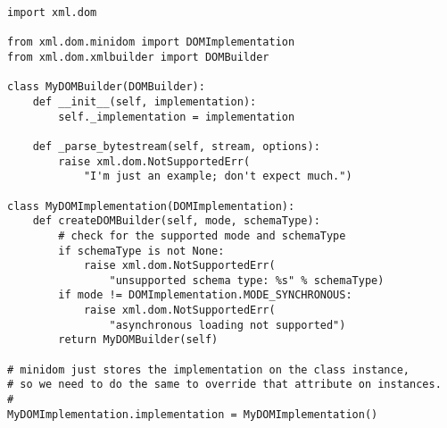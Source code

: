 \documentclass{howto}
\begin{document}
\begin{verbatim}
import xml.dom

from xml.dom.minidom import DOMImplementation
from xml.dom.xmlbuilder import DOMBuilder

class MyDOMBuilder(DOMBuilder):
    def __init__(self, implementation):
        self._implementation = implementation

    def _parse_bytestream(self, stream, options):
        raise xml.dom.NotSupportedErr(
            "I'm just an example; don't expect much.")

class MyDOMImplementation(DOMImplementation):
    def createDOMBuilder(self, mode, schemaType):
        # check for the supported mode and schemaType
        if schemaType is not None:
            raise xml.dom.NotSupportedErr(
                "unsupported schema type: %s" % schemaType)
        if mode != DOMImplementation.MODE_SYNCHRONOUS:
            raise xml.dom.NotSupportedErr(
                "asynchronous loading not supported")
        return MyDOMBuilder(self)

# minidom just stores the implementation on the class instance,
# so we need to do the same to override that attribute on instances.
#
MyDOMImplementation.implementation = MyDOMImplementation()
\end{verbatim}


\end{document}
